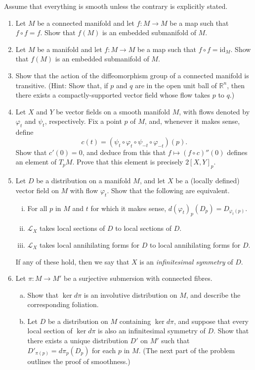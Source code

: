 \documentclass[11pt]{article} %
\begin{document}
Assume that everything is smooth unless the contrary is explicitly stated.

\begin{enumerate}
	\item Let $M$ be a connected manifold and let $f\colon M \to M$ be a map such that $f \circ f = f$. Show that $f(M)$ is an embedded submanifold of $M$. 

	\item Let $M$ be a manifold and let $f\colon M \to M$ be a map such that $f \circ f = \mathrm{id}_M$. Show that $f(M)$ is an embedded submanifold of $M$.

	\item Show that the action of the diffeomorphism group of a connected manifold is transitive. (Hint: Show that, if $p$ and $q$ are in the open unit ball of $\mathbb{R}^n$, then there exists a compactly-supported vector field whose flow takes $p$ to $q$.)

	\item Let $X$ and $Y$ be vector fields on a smooth manifold $M$, with flows denoted by $\varphi_t$ and $\psi_t$, respectively. Fix a point $p$ of $M$, and, whenever it makes sense, define
	\[
		c(t) = (\psi_t \circ \varphi_t \circ \psi_{-t} \circ \varphi_{-t})(p).
	\]
	Show that $c'(0) = 0$, and deduce from this that $f \mapsto (f \circ c)''(0)$ defines an element of $T_pM$. Prove that this element is precisely $2[X, Y]_p$.

	\item Let $D$ be a distribution on a manifold $M$, and let $X$ be a (locally defined) vector field on $M$ with flow $\varphi_t$. Show that the following are equivalent.
	\begin{enumerate}[(i)]
		\item For all $p$ in $M$ and $t$ for which it makes sense, $d(\varphi_t)_p(D_p) = D_{\varphi_t(p)}$.
		\item $\mathcal{L}_X$ takes local sections of $D$ to local sections of $D$.
		\item $\mathcal{L}_X$ takes local annihilating forms for $D$ to local annihilating forms for $D$.
	\end{enumerate}
	If any of these hold, then we say that $X$ is an \emph{infinitesimal symmetry} of $D$.

	\item Let $\pi\colon M \to M'$ be a surjective submersion with connected fibres.
	\begin{enumerate}[(a)]
		\item Show that $\ker d\pi$ is an involutive distribution on $M$, and describe the corresponding foliation.
		\item Let $D$ be a distribution on $M$ containing $\ker d\pi$, and suppose that every local section of $\ker d\pi$ is also an infinitesimal symmetry of $D$. Show that there exists a unique distribution $D'$ on $M'$ such that $D'_{\pi(p)} = d\pi_p(D_p)$ for each $p$ in $M$. (The next part of the problem outlines the proof of smoothness.)


\end{enumerate}
\end{enumerate}
\end{document}
